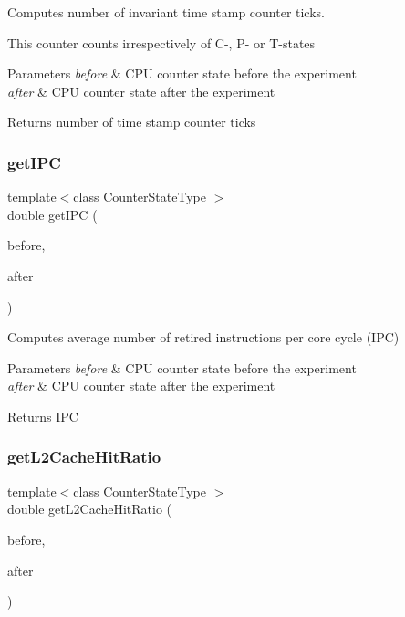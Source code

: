 Computes number of invariant time stamp counter ticks. 

This counter counts irrespectively of C-\/, P-\/ or T-\/states


\begin{DoxyParams}{Parameters}
{\em before} & C\+PU counter state before the experiment \\
\hline
{\em after} & C\+PU counter state after the experiment \\
\hline
\end{DoxyParams}
\begin{DoxyReturn}{Returns}
number of time stamp counter ticks 
\end{DoxyReturn}
\mbox{\label{classBasicCounterState_a7b0019d24a77dc05b7e47cb98192fd22}} 
\subsubsection{get\+I\+PC}
{\footnotesize\ttfamily template$<$class Counter\+State\+Type $>$ \\
double get\+I\+PC (\begin{DoxyParamCaption}\item[{const Counter\+State\+Type \&}]{before,  }\item[{const Counter\+State\+Type \&}]{after }\end{DoxyParamCaption})\hspace{0.3cm}{\ttfamily [friend]}}



Computes average number of retired instructions per core cycle (I\+PC) 


\begin{DoxyParams}{Parameters}
{\em before} & C\+PU counter state before the experiment \\
\hline
{\em after} & C\+PU counter state after the experiment \\
\hline
\end{DoxyParams}
\begin{DoxyReturn}{Returns}
I\+PC 
\end{DoxyReturn}
\mbox{\label{classBasicCounterState_a5922acedeec3c1cc67d20670f8ef0518}} 
\subsubsection{get\+L2\+Cache\+Hit\+Ratio}
{\footnotesize\ttfamily template$<$class Counter\+State\+Type $>$ \\
double get\+L2\+Cache\+Hit\+Ratio (\begin{DoxyParamCaption}\item[{const Counter\+State\+Type \&}]{before,  }\item[{const Counter\+State\+Type \&}]{after }\end{DoxyParamCaption})\hspace{0.3cm}{\ttfamily [friend]}}




